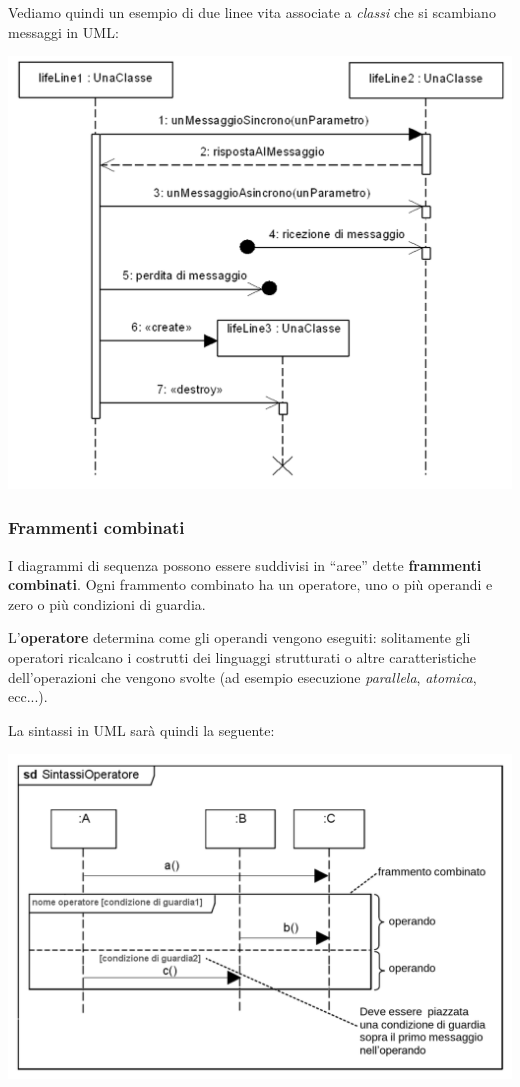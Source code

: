 \documentclass[a4paper,11pt]{article}
\begin{document}
Vediamo quindi un esempio di due linee vita associate a \textit{classi} che si scambiano messaggi in UML:
\begin{center}
	\includegraphics[scale=0.4]{../figures/lifeline_mess.png}
\end{center}

\subsubsection{Frammenti combinati}
I diagrammi di sequenza possono essere suddivisi in “aree” dette \textbf{frammenti combinati}.
Ogni frammento combinato ha un operatore, uno o più operandi e zero o più condizioni di guardia.

L'\textbf{operatore} determina come gli operandi vengono eseguiti: solitamente gli operatori ricalcano i costrutti dei linguaggi strutturati o altre caratteristiche dell'operazioni che vengono svolte (ad esempio esecuzione \textit{parallela}, \textit{atomica}, ecc...).

\newpage

La sintassi in UML sarà quindi la seguente:
\begin{center}
	\includegraphics[scale=0.4]{../figures/frammenti_comb.png}
\end{center}
\end{document}
